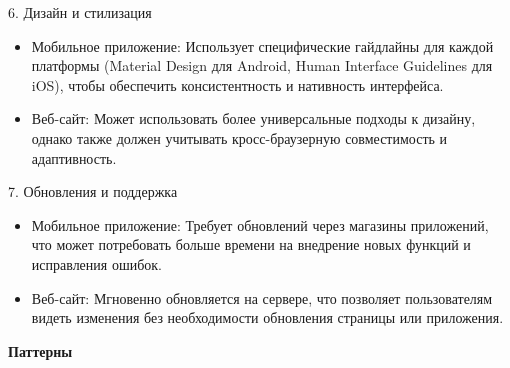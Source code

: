 6. Дизайн и стилизация

\begin{itemize}
    \item Мобильное приложение: Использует специфические гайдлайны для каждой платформы (Material Design для Android, Human Interface Guidelines для iOS), чтобы обеспечить консистентность и нативность интерфейса.
    \item Веб-сайт: Может использовать более универсальные подходы к дизайну, однако также должен учитывать кросс-браузерную совместимость и адаптивность.
\end{itemize}

7. Обновления и поддержка

\begin{itemize}
    \item Мобильное приложение: Требует обновлений через магазины приложений, что может потребовать больше времени на внедрение новых функций и исправления ошибок.
    \item Веб-сайт: Мгновенно обновляется на сервере, что позволяет пользователям видеть изменения без необходимости обновления страницы или приложения.
\end{itemize}
\bigskip

\textbf{Паттерны}

\noindent
\begin{minipage}{\linewidth}
\end{minipage}
\bigskip

